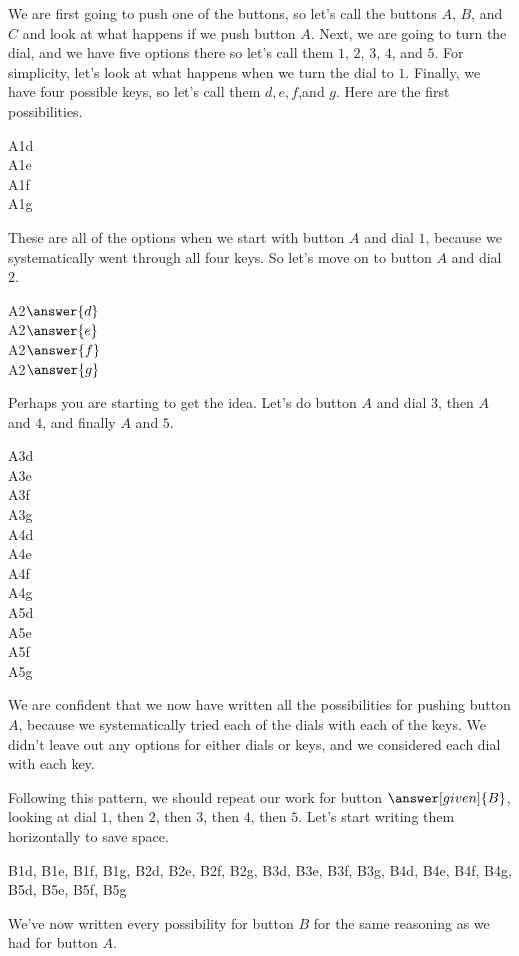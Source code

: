\documentclass{ximera}
\begin{document}
\begin{example}
We are first going to push one of the buttons, so let's call the buttons $A$, $B$, and $C$ and look at what happens if we push button $A$. Next, we are going to turn the dial, and we have five options there so let's call them $1$, $2$, $3$, $4$, and $5$. For simplicity, let's look at what happens when we turn the dial to $1$. Finally, we have four possible keys, so let's call them $d, e, f$,and $g$. Here are the first possibilities.
\begin{center}
A1d \\ A1e \\ A1f \\ A1g
\end{center}
These are all of the options when we start with button $A$ and dial $1$, because we systematically went through all four keys. So let's move on to button $A$ and dial $2$.
\begin{center}
A2$\answer{d}$ \\ A2$\answer{e}$ \\ A2$\answer{f}$ \\ A2$\answer{g}$
\end{center}
Perhaps you are starting to get the idea. Let's do button $A$ and dial $3$, then $A$ and $4$, and finally $A$ and $5$.
\begin{center}
A3d \\ A3e \\ A3f \\ A3g \\ A4d \\ A4e \\ A4f \\ A4g \\ A5d \\ A5e \\ A5f \\ A5g
\end{center}
We are confident that we now have written all the possibilities for pushing button $A$, because we systematically tried each of the dials with each of the keys. We didn't leave out any options for either dials or keys, and we considered each dial with each key.

Following this pattern, we should repeat our work for button $\answer[given]{B}$, looking at dial $1$, then $2$, then $3$, then $4$, then $5$. Let's start writing them horizontally to save space.
\begin{center}
B1d, B1e, B1f, B1g, B2d, B2e, B2f, B2g, B3d, B3e, B3f, B3g, B4d, B4e, B4f,  B4g,  B5d,  B5e,  B5f, B5g
\end{center}
We've now written every possibility for button $B$ for the same reasoning as we had for button $A$.


\end{example}
\end{document}
